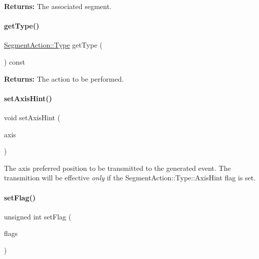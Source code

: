 {\bfseries Returns\+:} The associated {\ttfamily segment}. \mbox{\label{classKite_1_1SegmentAction_a093e88be27fab140cca8ec652beab529}} 
\paragraph{\texorpdfstring{get\+Type()}{getType()}}
{\footnotesize\ttfamily \mbox{\hyperlink{classKite_1_1SegmentAction_a1d1cfd8ffb84e947f82999c682b666a7}{Segment\+Action\+::\+Type}} get\+Type (\begin{DoxyParamCaption}{ }\end{DoxyParamCaption}) const\hspace{0.3cm}{\ttfamily [inline]}}

{\bfseries Returns\+:} The action to be performed. \mbox{\label{classKite_1_1SegmentAction_a8dc7cdf5f643a856fa5208bcfd1f8342}} 
\paragraph{\texorpdfstring{set\+Axis\+Hint()}{setAxisHint()}}
{\footnotesize\ttfamily void set\+Axis\+Hint (\begin{DoxyParamCaption}\item[{\textbf{ Db\+U\+::\+Unit}}]{axis }\end{DoxyParamCaption})\hspace{0.3cm}{\ttfamily [inline]}}

The axis preferred position to be transmitted to the generated event. The transmition will be effective {\itshape only} if the Segment\+Action\+::\+Type\+::\+Axis\+Hint flag is set. \mbox{\label{classKite_1_1SegmentAction_a4e1f44319a9a0a413fe1413a87ec78bd}} 
\paragraph{\texorpdfstring{set\+Flag()}{setFlag()}}
{\footnotesize\ttfamily unsigned int set\+Flag (\begin{DoxyParamCaption}\item[{unsigned int}]{flags }\end{DoxyParamCaption})\hspace{0.3cm}{\ttfamily [inline]}}

